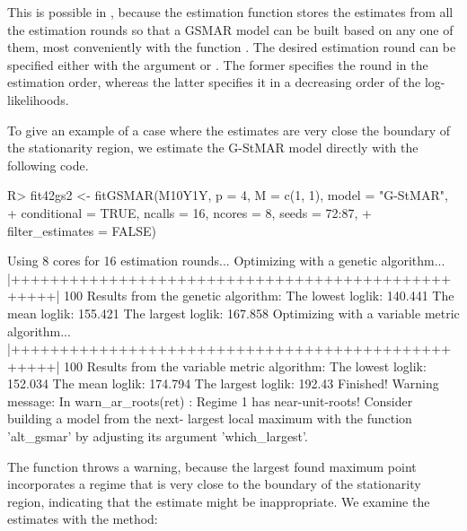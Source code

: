 \documentclass[nojss]{jss} %
\begin{document}
This is possible in , because the estimation function  stores the estimates from all the estimation rounds so that a GSMAR model can be built based on any one of them, most conveniently with the function . The desired estimation round can be specified either with the argument  or . The former specifies the round in the estimation order, whereas the latter specifies it in a decreasing order of the log-likelihoods.

To give an example of a case where the estimates are very close the boundary of the stationarity region, we estimate the G-StMAR model directly with the following code.
%
\begin{CodeChunk}
\begin{CodeInput}
R> fit42gs2 <- fitGSMAR(M10Y1Y, p = 4, M = c(1, 1), model = "G-StMAR",
+    conditional = TRUE, ncalls = 16, ncores = 8, seeds = 72:87,
+    filter_estimates = FALSE)
\end{CodeInput}
\begin{CodeOutput}
Using 8 cores for 16 estimation rounds...
Optimizing with a genetic algorithm...
  |++++++++++++++++++++++++++++++++++++++++++++++++++| 100%
Results from the genetic algorithm:
The lowest loglik:  140.441
The mean loglik:    155.421
The largest loglik: 167.858
Optimizing with a variable metric algorithm...
  |++++++++++++++++++++++++++++++++++++++++++++++++++| 100%
Results from the variable metric algorithm:
The lowest loglik:  152.034
The mean loglik:    174.794
The largest loglik: 192.43
Finished!
Warning message:
In warn_ar_roots(ret) :
  Regime 1 has near-unit-roots! Consider building a model from the next-
  largest local maximum with the function 'alt_gsmar' by adjusting its
  argument 'which_largest'.
\end{CodeOutput}
\end{CodeChunk}
%
The function throws a warning, because the largest found maximum point incorporates a regime that is very close to the boundary of the stationarity region, indicating that the estimate might be inappropriate.
We examine the estimates with the  method:
%
\end{document}
